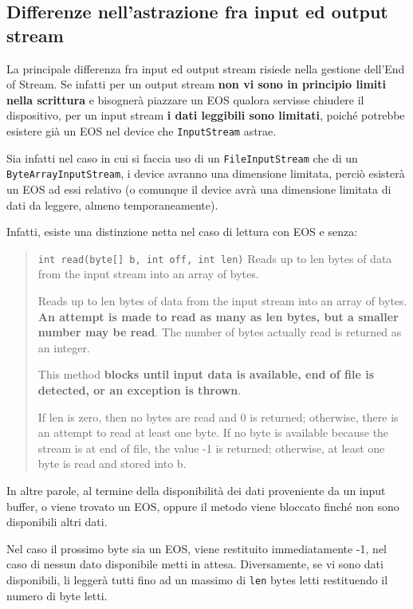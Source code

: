 \documentclass[\fontsizeclass,twocolumn]{\classname}
\theoremstyle{definition}
\theoremstyle{definition}
\begin{document}
\subsection{Differenze nell'astrazione fra input ed output stream}

La principale differenza fra input ed output stream risiede nella gestione
dell'End of Stream. Se infatti per un output stream \textbf{non vi sono in
principio limiti nella scrittura} e bisognerà piazzare un EOS qualora servisse
chiudere il dispositivo, per un input stream \textbf{i dati leggibili sono
limitati}, poiché potrebbe esistere già un EOS nel device che
\texttt{Input\-Stream} astrae.

Sia infatti nel caso in cui si faccia uso di un \texttt{FileInputStream} che di
un \texttt{ByteArrayInputStream}, i device avranno una dimensione limitata,
perciò esisterà un EOS ad essi relativo (o comunque il device avrà una
dimensione limitata di dati da leggere, almeno temporaneamente).

Infatti, esiste una distinzione netta nel caso di lettura con EOS e senza:
\begin{quote}
    \footnotesize{\texttt{int 	read(byte[] b, int off, int len)} 	Reads up to
        len bytes of data from the input stream into an array of bytes.

Reads up to len bytes of data from the input stream into an array of bytes.
\textbf{An attempt is made to read as many as len bytes, but a smaller number
may be read}. The number of bytes actually read is returned as an integer.

This method \textbf{blocks until input data is available, end of file is
detected, or an exception is thrown}.

If len is zero, then no bytes are read and 0 is returned; otherwise, there is
an attempt to read at least one byte. If no byte is available because the
stream is at end of file, the value -1 is returned; otherwise, at least one
byte is read and stored into b.}
\end{quote}

In altre parole, al termine della disponibilità dei dati proveniente da un
input buffer, o viene trovato un EOS, oppure il metodo viene bloccato finché
non sono disponibili altri dati.

Nel caso il prossimo byte sia un EOS, viene restituito immediatamente -1, nel
caso di nessun dato disponibile metti in attesa. Diversamente, se vi sono dati
disponibili, li leggerà tutti fino ad un massimo di \texttt{len} bytes letti
restituendo il numero di byte letti.
\end{document}
